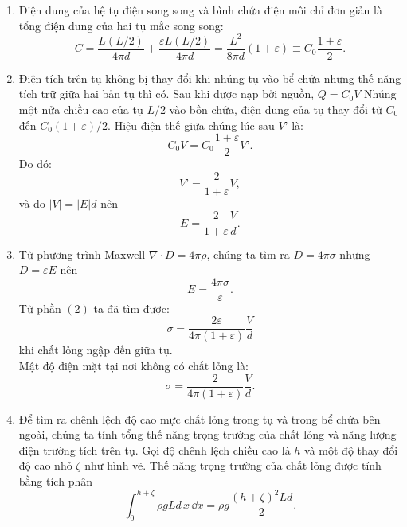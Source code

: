 \begin{loigiai}
\begin{enumerate}[1)]
   \item Điện dung của hệ tụ điện song song và bình chứa điện môi chỉ đơn giản là tổng điện dung của hai tụ mắc song song:
        $$C = \dfrac{L(L/2)}{4\pi d} + \dfrac{\varepsilon L(L/2)}{4\pi d} = \dfrac{L^2}{8\pi d} (1+\varepsilon) \equiv C_0\dfrac{1+\varepsilon}{2}.$$
    \item  Điện tích trên tụ không bị thay đổi khi nhúng tụ vào bể chứa nhưng thế năng tích trữ giữa hai bản tụ thì có. Sau khi được nạp bởi nguồn, $Q=C_0 V$ Nhúng một nửa chiều cao của tụ $L/2$ vào bồn chứa, điện dung của tụ thay đổi từ $C_0$ đến $C_0(1+\varepsilon)/2$. Hiệu điện thế giữa chúng lúc sau $V’$ là:
           $$C_0V = C_0\dfrac{1+\varepsilon}{2}V’.$$
           Do đó:
           $$V’ = \dfrac{2}{1+\varepsilon}V,$$
           và do $|V| = |E|d$ nên
            $$E = \dfrac{2}{1+\varepsilon} \dfrac{V}{d}.$$
    \item Từ phương trình Maxwell $\nabla\cdot D = 4\pi\rho$, chúng ta tìm ra $D = 4\pi\sigma$ nhưng $D = \varepsilon E$ nên
    $$E = \dfrac{4\pi\sigma}{\varepsilon}.$$
    Từ phần $(2)$ ta đã tìm được: 
    $$\sigma = \dfrac{2\varepsilon}{4\pi(1+\varepsilon)} \dfrac{V}{d}$$
khi chất lỏng ngập đến giữa tụ.\\ Mật độ điện mặt tại nơi không có chất lỏng là:
    $$\sigma = \dfrac{2}{4\pi(1+\varepsilon)} \dfrac{V}{d}.$$
    \item Để tìm ra chênh lệch độ cao mực chất lỏng trong tụ và trong bể chứa bên ngoài, chúng ta tính tổng thế năng trọng trường của chất lỏng và năng lượng điện trường tích trên tụ. Gọi độ chênh lệch chiều cao là $h$ và một độ thay đổi độ cao nhỏ $\zeta$ như hình vẽ. Thế năng trọng trường của chất lỏng được tính bằng tích phân 
      $$\int_{0}^{h+\zeta}\rho gL d\,x\,\dd x = \rho g \dfrac{(h+\zeta)^2Ld}{2}.$$
       \begin{center}
            


\begin{tikzpicture}[x=0.75pt,y=0.75pt,yscale=-1,xscale=1]


\end{tikzpicture}
\end{center}
\end{enumerate}
\end{loigiai}
